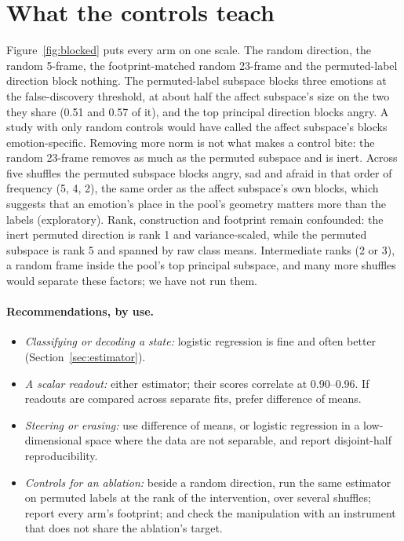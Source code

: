 \documentclass{article}
\begin{document}
\section{What the controls teach}
\label{sec:controls}
Figure~\ref{fig:blocked} puts every arm on one scale. The random direction, the random 5-frame, the footprint-matched random 23-frame and the permuted-label direction block nothing. The permuted-label subspace blocks three emotions at the false-discovery threshold, at about half the affect subspace's size on the two they share (0.51 and 0.57 of it), and the top principal direction blocks angry. A study with only random controls would have called the affect subspace's blocks emotion-specific. Removing more norm is not what makes a control bite: the random 23-frame removes as much as the permuted subspace and is inert. Across five shuffles the permuted subspace blocks angry, sad and afraid in that order of frequency (5, 4, 2), the same order as the affect subspace's own blocks, which suggests that an emotion's place in the pool's geometry matters more than the labels (exploratory). Rank, construction and footprint remain confounded: the inert permuted direction is rank 1 and variance-scaled, while the permuted subspace is rank 5 and spanned by raw class means. Intermediate ranks (2 or 3), a random frame inside the pool's top principal subspace, and many more shuffles would separate these factors; we have not run them.

\paragraph{Recommendations, by use.}
\begin{itemize}[leftmargin=1.2em,itemsep=1pt,topsep=2pt]
\item \emph{Classifying or decoding a state:} logistic regression is fine and often better (Section~\ref{sec:estimator}).
\item \emph{A scalar readout:} either estimator; their scores correlate at 0.90--0.96. If readouts are compared across separate fits, prefer difference of means.
\item \emph{Steering or erasing:} use difference of means, or logistic regression in a low-dimensional space where the data are not separable, and report disjoint-half reproducibility.
\item \emph{Controls for an ablation:} beside a random direction, run the same estimator on permuted labels at the rank of the intervention, over several shuffles; report every arm's footprint; and check the manipulation with an instrument that does not share the ablation's target.
\end{itemize}
\end{document}
